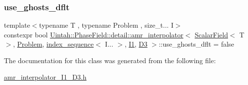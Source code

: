\subsubsection{\texorpdfstring{use\+\_\+ghosts\+\_\+dflt}{use\_ghosts\_dflt}}
{\footnotesize\ttfamily template$<$typename T , typename Problem , size\+\_\+t... I$>$ \\
constexpr bool \hyperlink{classUintah_1_1PhaseField_1_1detail_1_1amr__interpolator}{Uintah\+::\+Phase\+Field\+::detail\+::amr\+\_\+interpolator}$<$ \hyperlink{structUintah_1_1PhaseField_1_1ScalarField}{Scalar\+Field}$<$ T $>$, \hyperlink{classUintah_1_1PhaseField_1_1Problem}{Problem}, \hyperlink{namespaceUintah_1_1PhaseField_a237de804d99512e50613aff7c94a9461}{index\+\_\+sequence}$<$ I... $>$, \hyperlink{namespaceUintah_1_1PhaseField_a547ce3002aa97fbd3ef3192a6eec8406a66f19efe774b0d2b6e5844eb2d83d305}{I1}, \hyperlink{namespaceUintah_1_1PhaseField_a12bfc68444894dffdf0cb8d9cf0cc76aa72fd61934c7ca788c49ad90629f76e78}{D3} $>$\+::use\+\_\+ghosts\+\_\+dflt = false\hspace{0.3cm}{\ttfamily [static]}}



The documentation for this class was generated from the following file\+:\begin{DoxyCompactItemize}
\item 
\hyperlink{amr__interpolator__I1__D3_8h}{amr\+\_\+interpolator\+\_\+\+I1\+\_\+\+D3.\+h}\end{DoxyCompactItemize}
